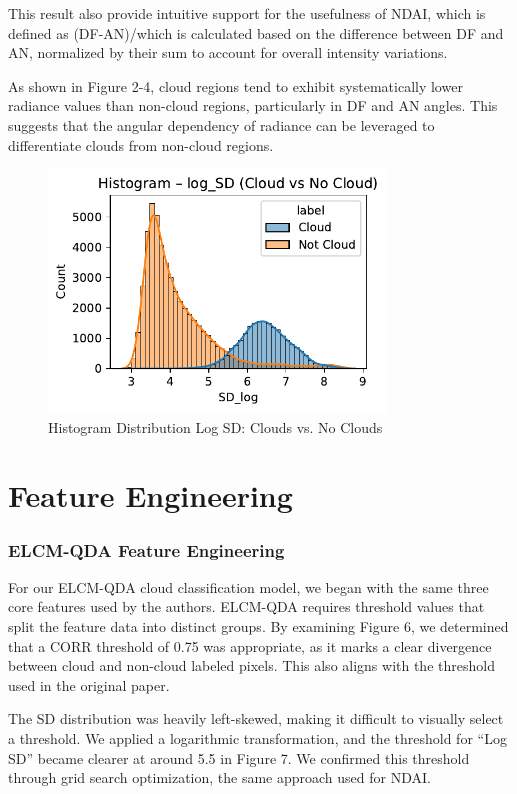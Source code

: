 \documentclass[10pt,letterpaper]{article}
\begin{document}
This result also provide intuitive support for the usefulness of NDAI, which is defined as (DF-AN)/which is calculated based on the difference between DF and AN, normalized by their sum to account for overall intensity variations.

As shown in Figure 2-4, cloud regions tend to exhibit systematically lower radiance values than non-cloud regions, particularly in DF and AN angles. This suggests that the angular dependency of radiance can be leveraged to differentiate clouds from non-cloud regions. 

\begin{figure}[H]
    \centering
    \includegraphics[width=0.8\textwidth]{sd_log_fig.pdf}
    \caption{Histogram Distribution Log SD: Clouds vs. No Clouds}
    \label{Figure X}
\end{figure}

\section{Feature Engineering}

\subsubsection{ELCM-QDA Feature Engineering}

For our ELCM-QDA cloud classification model, we began with the same three core features used by the authors. ELCM-QDA requires threshold values that split the feature data into distinct groups. By examining Figure 6, we determined that a CORR threshold of 0.75 was appropriate, as it marks a clear divergence between cloud and non-cloud labeled pixels. This also aligns with the threshold used in the original paper.

The SD distribution was heavily left-skewed, making it difficult to visually select a threshold. We applied a logarithmic transformation, and the threshold for “Log SD” became clearer at around 5.5 in Figure 7. We confirmed this threshold through grid search optimization, the same approach used for NDAI.
\end{document}
